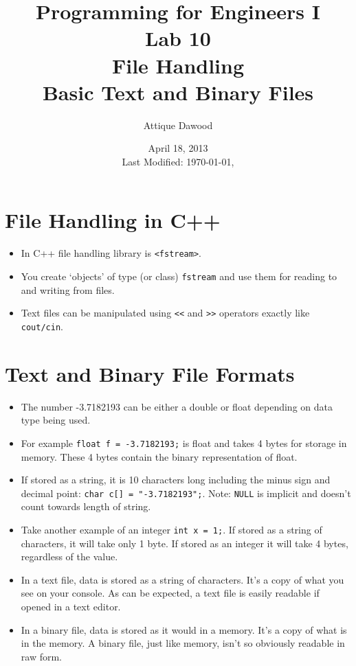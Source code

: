 \documentclass[12pt,a4paper]{article}
\title{Programming for Engineers I\\Lab 10\\File Handling\\Basic Text and Binary Files}
\author{Attique Dawood}
\date{April 18, 2013\\[0.2cm] Last Modified: \today, \currenttime}
\begin{document}
\maketitle
\section{File Handling in C++}
\begin{itemize}
\item In C++ file handling library is \verb|<fstream>|.
\item You create `objects' of type (or class) \verb|fstream| and use them for reading to and writing from files.
\item Text files can be manipulated using \verb|<<| and \verb|>>| operators exactly like \verb|cout/cin|.
\end{itemize}
\section{Text and Binary File Formats}
\begin{itemize}
\item The number -3.7182193 can be either a double or float depending on data type being used.
\item For example \verb|float f = -3.7182193;| is float and takes 4 bytes for storage in memory. These 4 bytes contain the binary representation of float.
\item If stored as a string, it is 10 characters long including the minus sign and decimal point: \verb|char c[] = "-3.7182193";|. Note: \verb|NULL| is implicit and doesn't count towards length of string.
\item Take another example of an integer \verb|int x = 1;|. If stored as a string of characters, it will take only 1 byte. If stored as an integer it will take 4 bytes, regardless of the value.
\item In a text file, data is stored as a string of characters. It's a copy of what you see on your console. As can be expected, a text file is easily readable if opened in a text editor.
\item In a binary file, data is stored as it would in a memory. It's a copy of what is in the memory. A binary file, just like memory, isn't so obviously readable in raw form.
\end{itemize}
\end{document}
